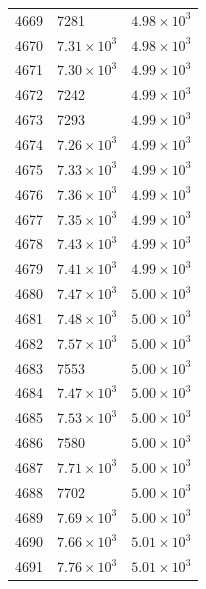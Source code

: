 \begin{table}[H]
\begin{tabular}{lll}
4669 & 7281 & $\displaystyle 4.98 \times 10^{3}$ \\
4670 & $\displaystyle 7.31 \times 10^{3}$ & $\displaystyle 4.98 \times 10^{3}$ \\
4671 & $\displaystyle 7.30 \times 10^{3}$ & $\displaystyle 4.99 \times 10^{3}$ \\
4672 & 7242 & $\displaystyle 4.99 \times 10^{3}$ \\
4673 & 7293 & $\displaystyle 4.99 \times 10^{3}$ \\
4674 & $\displaystyle 7.26 \times 10^{3}$ & $\displaystyle 4.99 \times 10^{3}$ \\
4675 & $\displaystyle 7.33 \times 10^{3}$ & $\displaystyle 4.99 \times 10^{3}$ \\
4676 & $\displaystyle 7.36 \times 10^{3}$ & $\displaystyle 4.99 \times 10^{3}$ \\
4677 & $\displaystyle 7.35 \times 10^{3}$ & $\displaystyle 4.99 \times 10^{3}$ \\
4678 & $\displaystyle 7.43 \times 10^{3}$ & $\displaystyle 4.99 \times 10^{3}$ \\
4679 & $\displaystyle 7.41 \times 10^{3}$ & $\displaystyle 4.99 \times 10^{3}$ \\
4680 & $\displaystyle 7.47 \times 10^{3}$ & $\displaystyle 5.00 \times 10^{3}$ \\
4681 & $\displaystyle 7.48 \times 10^{3}$ & $\displaystyle 5.00 \times 10^{3}$ \\
4682 & $\displaystyle 7.57 \times 10^{3}$ & $\displaystyle 5.00 \times 10^{3}$ \\
4683 & 7553 & $\displaystyle 5.00 \times 10^{3}$ \\
4684 & $\displaystyle 7.47 \times 10^{3}$ & $\displaystyle 5.00 \times 10^{3}$ \\
4685 & $\displaystyle 7.53 \times 10^{3}$ & $\displaystyle 5.00 \times 10^{3}$ \\
4686 & 7580 & $\displaystyle 5.00 \times 10^{3}$ \\
4687 & $\displaystyle 7.71 \times 10^{3}$ & $\displaystyle 5.00 \times 10^{3}$ \\
4688 & 7702 & $\displaystyle 5.00 \times 10^{3}$ \\
4689 & $\displaystyle 7.69 \times 10^{3}$ & $\displaystyle 5.00 \times 10^{3}$ \\
4690 & $\displaystyle 7.66 \times 10^{3}$ & $\displaystyle 5.01 \times 10^{3}$ \\
4691 & $\displaystyle 7.76 \times 10^{3}$ & $\displaystyle 5.01 \times 10^{3}$ \\

\end{tabular}
\end{table}
